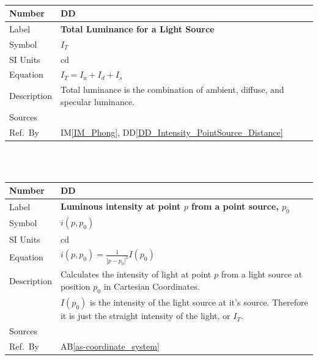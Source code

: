 \documentclass[12pt]{article}
\newcommand{\colAwidth}{0.13\textwidth}
\newcommand{\colBwidth}{0.82\textwidth}
\newcounter{defnum} %
\newcounter{datadefnum} %
\newcommand{\ddref}[1]{DD\ref{#1}}
\newcommand{\aBref}[1]{AB\ref{#1}}
\newcommand{\iref}[1]{IM\ref{#1}}
\begin{document}
~\newline

\noindent
\begin{minipage}{\textwidth}
	\renewcommand*{\arraystretch}{1.5}
	\begin{tabular}{| p{\colAwidth} | p{\colBwidth}|}
		\hline
		\rowcolor[gray]{0.9}
		Number& DD{datadefnum}\thedatadefnum 
		\label{DD_Intensity_Total}\\
		\hline
		Label& \bf Total Luminance for a Light Source\\
		\hline
		Symbol &$I_{T}$\\
		\hline
		SI Units & cd\\
		\hline
		Equation&$I_{T} = I_{a} + I_{d} + I_{s}$ \\
		\hline
		Description & Total luminance is the combination of ambient, diffuse, 
		and specular luminance.
		\\
		\hline
		Sources& \cite{shreiner2012}\\
		\hline
		Ref.\ By & \iref{IM_Phong}, \ddref{DD_Intensity_PointSource_Distance} \\
		\hline
	\end{tabular}
\end{minipage}\\

~\newline

\noindent
\begin{minipage}{\textwidth}
	\renewcommand*{\arraystretch}{1.5}
	\begin{tabular}{| p{\colAwidth} | p{\colBwidth}|}
		\hline
		\rowcolor[gray]{0.9}
		Number& DD{datadefnum}\thedatadefnum 
		\label{DD_Intensity_PointSource_Distance}\\
		\hline
		Label& \bf Luminous intensity at point $p$ from a point source, 
		$p_{0}$\\
		\hline
		Symbol &$i(p, p_{0})$\\
		\hline
		SI Units & cd\\
		\hline
		Equation&$i(p, p_{0}) = \frac{1}{|p-p_{0}|^2} I(p_{0})$\\
		\hline
		Description & Calculates the intensity of light at point $p$ from a 
		light source at position $p_{0}$ in Cartesian Coordinates.\\
		& $I(p_{0})$ is the intensity of the light source at it's source. 
		Therefore it is just the straight intensity of the light, or $I_{T}$.\\
		\hline
		Sources& \cite{Lengyel2003}\\
		\hline
		Ref.\ By & \aBref{as-coordinate_system} \\
		\hline
	\end{tabular}
\end{minipage}\\
\end{document}
